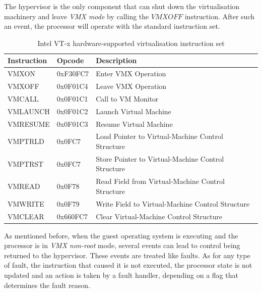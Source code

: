 The hypervisor is the only component that can shut down the virtualisation machinery and leave \emph{VMX mode} by calling the $VMXOFF$ instruction. After such an event, the processor will operate with the standard instruction set.%


\begin{table}[t]
\centering
\begin{tabular}{|l|l|l|}
\hline
\bf{Instruction} & \bf{Opcode}  & \bf{Description}  \\
\hline

VMXON    & 0xF30FC7 & Enter VMX Operation \\
VMXOFF   & 0x0F01C4 & Leave VMX Operation \\
VMCALL   & 0x0F01C1 & Call to VM Monitor \\
VMLAUNCH & 0x0F01C2 & Launch Virtual Machine \\
VMRESUME & 0x0F01C3 & Resume Virtual Machine \\
VMPTRLD  & 0x0FC7   & Load Pointer to Virtual-Machine Control Structure \\
VMPTRST  & 0x0FC7   & Store Pointer to Virtual-Machine Control Structure \\
VMREAD   & 0x0F78   & Read Field from Virtual-Machine Control Structure \\
VMWRITE  & 0x0F79   & Write Field to Virtual-Machine Control Structure \\
VMCLEAR  & 0x660FC7 & Clear Virtual-Machine Control Structure \\
\hline
\end{tabular}
\caption{Intel VT-x hardware-supported virtualisation instruction set}
\label{virt:intelvt}
\end{table}

As mentioned before, when the guest operating system is executing and the processor is in \emph{VMX non-root} mode, several events can lead to control being returned to the hypervisor. These events are treated like faults. As for any type of fault, the instruction that caused it is not executed, the processor state is not updated and an action is taken by a fault handler, depending on a flag that determines the fault reason. %

